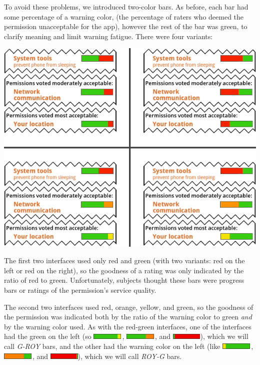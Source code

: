 \documentclass[11pt]{article}
\begin{document}
To avoid these problems, we
introduced two-color bars. As before, each bar had some percentage of 
a warning color, (the percentage of raters who deemed the permission
unacceptable for the app), however the rest of the
bar was green, to clarify meaning and limit warning fatigue.
There were four variants:
\label{ss-sec-pbars-r4}
\begin{center}
\includegraphics[width=.85\linewidth]{candidate-img/bars/barsR4.png}
\end{center}
The first two interfaces used only red 
and green (with two variants: red on the left or red on the right),
so the goodness of a rating was only indicated by the ratio of red to green.
Unfortunately, subjects thought these bars were
progress bars or ratings of the 
permission's service quality.

The second two interfaces used red, orange, yellow, and green, so the goodness of the permission
was indicated both by the ratio of the warning color to green \emph{and} by the warning color
used. As with the red-green interfaces, one of the interfaces had the green on the left (so 
\includegraphics[height=8pt]{img/Bars4/RedYellowGreen/GreenYellowBar.png}\,,
\includegraphics[height=8pt]{img/Bars4/RedYellowGreen/GreenOrangeBar.png}\,, and 
\includegraphics[height=8pt]{img/Bars4/RedYellowGreen/GreenRedBar.png}),
which we will call \emph{G-ROY} bars, and the
other had the warning color on the left (like 
\includegraphics[height=8pt]{img/Bars4/RedYellowGreen/YellowGreenBar.png}\,,
\includegraphics[height=8pt]{img/Bars4/RedYellowGreen/OrangeGreenBar.png}\,, and
\includegraphics[height=8pt]{img/Bars4/RedYellowGreen/RedGreenBar.png}),
which we will call \emph{ROY-G} bars.
\end{document}
